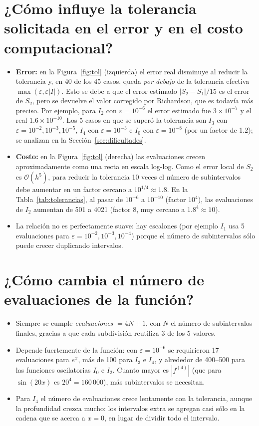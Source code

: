 \documentclass[11pt,letterpaper]{report}
\begin{document}
\section{¿Cómo influye la tolerancia solicitada en el error y en el costo computacional?}
\begin{itemize}
  \item \textbf{Error:} en la Figura~\ref{fig:tol} (izquierda) el error real disminuye al reducir la
        tolerancia y, en 40 de los 45 casos, queda \emph{por debajo} de la tolerancia efectiva
        $\max(\varepsilon,\varepsilon|I|)$. Esto se debe a que el error estimado $|S_2-S_1|/15$ es el
        error de $S_2$, pero se devuelve el valor corregido por Richardson, que es todavía más preciso.
        Por ejemplo, para $I_2$ con $\varepsilon=10^{-6}$ el error estimado fue $3\times10^{-7}$ y el real
        $1.6\times10^{-10}$. Los 5 casos en que se superó la tolerancia son $I_3$ con
        $\varepsilon=10^{-2},10^{-3},10^{-5}$, $I_4$ con $\varepsilon=10^{-3}$ e $I_0$ con
        $\varepsilon=10^{-8}$ (por un factor de 1.2); se analizan en la Sección~\ref{sec:dificultades}.
  \item \textbf{Costo:} en la Figura~\ref{fig:tol} (derecha) las evaluaciones crecen
        aproximadamente como una recta en escala log-log. Como el error local de $S_2$ es
        $\mathcal{O}(h^5)$, para reducir la tolerancia 10 veces el número de subintervalos debe aumentar
        en un factor cercano a $10^{1/4}\approx1.8$. En la Tabla~\ref{tab:tolerancias}, al pasar de
        $10^{-6}$ a $10^{-10}$ (factor $10^4$), las evaluaciones de $I_2$ aumentan de 501 a 4021
        (factor 8, muy cercano a $1.8^4\approx10$).
  \item La relación no es perfectamente suave: hay escalones (por ejemplo $I_1$ usa 5 evaluaciones
        para $\varepsilon=10^{-2},10^{-3},10^{-4}$) porque el número de subintervalos sólo puede crecer
        duplicando intervalos.
\end{itemize}

\section{¿Cómo cambia el número de evaluaciones de la función?}
\begin{itemize}
  \item Siempre se cumple \emph{evaluaciones} $=4N+1$, con $N$ el número de subintervalos finales,
        gracias a que cada subdivisión reutiliza 3 de los 5 valores.
  \item Depende fuertemente de la función: con $\varepsilon=10^{-6}$ se requirieron 17 evaluaciones
        para $e^x$, más de 100 para $I_3$ e $I_4$, y alrededor de 400--500 para las funciones
        oscilatorias $I_0$ e $I_2$. Cuanto mayor es $|f^{(4)}|$ (que para $\sin(20x)$ es $20^4=160\,000$),
        más subintervalos se necesitan.
  \item Para $I_4$ el número de evaluaciones crece lentamente con la tolerancia, aunque la
        profundidad crezca mucho: los intervalos extra se agregan casi sólo en la cadena que
        se acerca a $x=0$, en lugar de dividir todo el intervalo.
\end{itemize}
\end{document}
